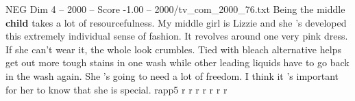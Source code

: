 \begin{textsample}{NEG Dim 4 – 2000 – Score -1.00 – 2000/tv\_com\_2000\_76.txt}  \label{ex:f4_neg_024}
Being the middle \textbf{child} takes a lot of resourcefulness.
My middle girl is Lizzie and she 's developed this extremely individual sense of fashion.
It revolves around one very pink dress.
If she can't wear it, the whole look crumbles.
Tied with bleach alternative helps get out more tough stains in one wash while other leading liquids have to go back in the wash again.
She 's going to need a lot of freedom.
I think it 's important for her to know that she is special. rapp5 r r r r r r r

\end{textsample}
